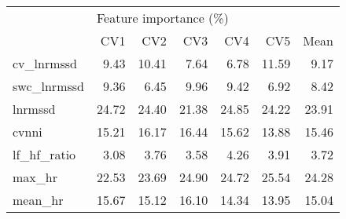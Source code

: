 \begin{tabular}{lrrrrrr}
\toprule
{} & \multicolumn{6}{l}{Feature importance (\%)} \\
{} &                    CV1 &    CV2 &    CV3 &    CV4 &    CV5 &   Mean \\
\midrule
cv\_lnrmssd  &                   9.43 &  10.41 &   7.64 &   6.78 &  11.59 &   9.17 \\
swc\_lnrmssd &                   9.36 &   6.45 &   9.96 &   9.42 &   6.92 &   8.42 \\
lnrmssd     &                  24.72 &  24.40 &  21.38 &  24.85 &  24.22 &  23.91 \\
cvnni       &                  15.21 &  16.17 &  16.44 &  15.62 &  13.88 &  15.46 \\
lf\_hf\_ratio &                   3.08 &   3.76 &   3.58 &   4.26 &   3.91 &   3.72 \\
max\_hr      &                  22.53 &  23.69 &  24.90 &  24.72 &  25.54 &  24.28 \\
mean\_hr     &                  15.67 &  15.12 &  16.10 &  14.34 &  13.95 &  15.04 \\
\bottomrule
\end{tabular}
